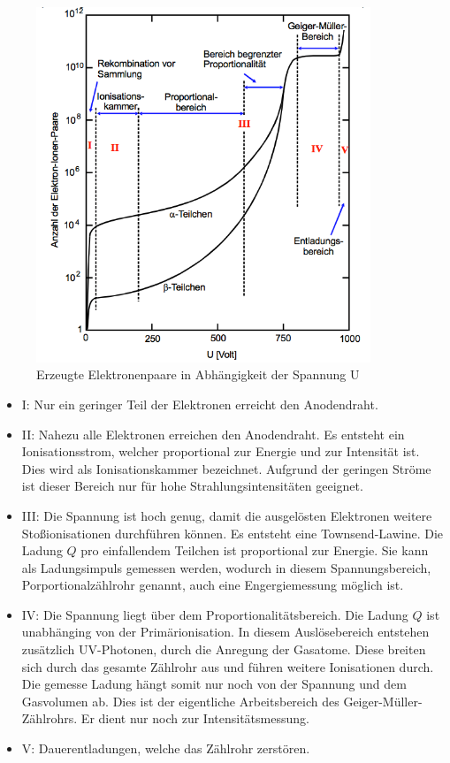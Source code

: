 \begin{figure}
  \centering
  \includegraphics[width=10cm]{bilder/bereiche.png}
  \caption{Erzeugte Elektronenpaare in Abhängigkeit der Spannung U \cite{703}}
  \label{fig:bereiche}
\end{figure}
\begin{itemize}
  \item{I: Nur ein geringer Teil der Elektronen erreicht den Anodendraht.} \\
  \item{II: Nahezu alle Elektronen erreichen den Anodendraht. Es entsteht ein
  Ionisationsstrom, welcher proportional zur Energie und zur Intensität ist. Dies
  wird als Ionisationskammer bezeichnet. Aufgrund der geringen Ströme ist dieser Bereich
  nur für hohe Strahlungsintensitäten geeignet.} \\
  \item{III: Die Spannung ist hoch genug, damit die ausgelösten Elektronen weitere
  Stoßionisationen durchführen können. Es entsteht eine Townsend-Lawine. Die Ladung $Q$
  pro einfallendem Teilchen
  ist proportional zur Energie. Sie kann als Ladungsimpuls gemessen werden, wodurch
  in diesem Spannungsbereich, Porportionalzählrohr genannt, auch eine Engergiemessung
  möglich ist.} \\
  \item{IV: Die Spannung liegt über dem Proportionalitätsbereich. Die Ladung $Q$ ist
  unabhänging von der Primärionisation. In diesem Auslösebereich entstehen zusätzlich
  UV-Photonen, durch die Anregung der Gasatome. Diese breiten sich durch das gesamte
  Zählrohr aus und führen weitere Ionisationen durch. Die gemesse Ladung hängt somit
  nur noch von der Spannung und dem Gasvolumen ab. Dies ist der eigentliche Arbeitsbereich
  des Geiger-Müller-Zählrohrs. Er dient nur noch zur Intensitätsmessung.} \\
  \item{V: Dauerentladungen, welche das Zählrohr zerstören.}
\end{itemize}
